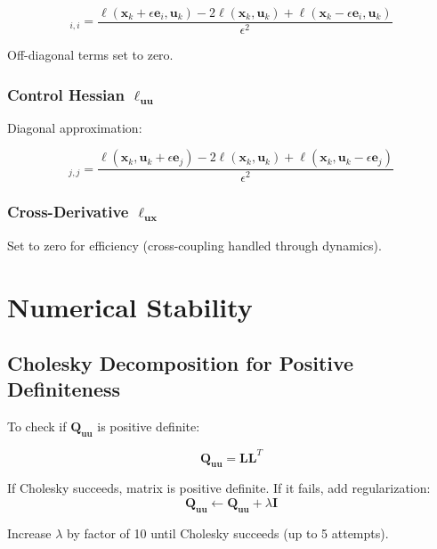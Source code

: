 \documentclass[11pt,a4paper]{article}
\begin{document}
\begin{equation}
[\ell_{\mathbf{xx}}]_{i,i} = \frac{\ell(\mathbf{x}_k + \epsilon \mathbf{e}_i, \mathbf{u}_k) - 2\ell(\mathbf{x}_k, \mathbf{u}_k) + \ell(\mathbf{x}_k - \epsilon \mathbf{e}_i, \mathbf{u}_k)}{\epsilon^2}
\end{equation}

Off-diagonal terms set to zero.

\subsubsection{Control Hessian $\ell_{\mathbf{uu}}$}

Diagonal approximation:

\begin{equation}
[\ell_{\mathbf{uu}}]_{j,j} = \frac{\ell(\mathbf{x}_k, \mathbf{u}_k + \epsilon \mathbf{e}_j) - 2\ell(\mathbf{x}_k, \mathbf{u}_k) + \ell(\mathbf{x}_k, \mathbf{u}_k - \epsilon \mathbf{e}_j)}{\epsilon^2}
\end{equation}

\subsubsection{Cross-Derivative $\ell_{\mathbf{ux}}$}

Set to zero for efficiency (cross-coupling handled through dynamics).

\section{Numerical Stability}

\subsection{Cholesky Decomposition for Positive Definiteness}

To check if $\mathbf{Q}_{\mathbf{uu}}$ is positive definite:

\begin{equation}
\mathbf{Q}_{\mathbf{uu}} = \mathbf{L} \mathbf{L}^T
\end{equation}

If Cholesky succeeds, matrix is positive definite. If it fails, add regularization:
\begin{equation}
\mathbf{Q}_{\mathbf{uu}} \leftarrow \mathbf{Q}_{\mathbf{uu}} + \lambda \mathbf{I}
\end{equation}

Increase $\lambda$ by factor of 10 until Cholesky succeeds (up to 5 attempts).
\end{document}
